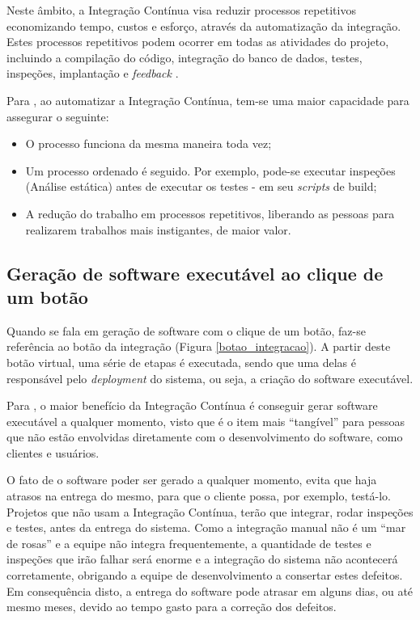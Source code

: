 Neste âmbito, a Integração Contínua visa reduzir processos repetitivos economizando tempo, custos e esforço, através da automatização da integração. Estes processos repetitivos podem ocorrer em todas as atividades do projeto, incluindo a compilação do código, integração do banco de dados, testes, inspeções, implantação e \textit{feedback} \cite{DUVALL}.

Para , ao automatizar a Integração Contínua, tem-se uma maior capacidade para assegurar o seguinte:

\begin{itemize}
    \item{O processo funciona da mesma maneira toda vez;}
    \item{Um processo ordenado é seguido. Por exemplo, pode-se executar inspeções (Análise estática) antes de executar os testes - em seu \textit{scripts} de build;}
    \item{A redução do trabalho em processos repetitivos, liberando as pessoas para realizarem trabalhos mais instigantes, de maior valor.}
\end{itemize}

\subsection{Geração de software executável ao clique de um botão}

Quando se fala em geração de software com o clique de um botão, faz-se referência ao botão da integração (Figura \ref{botao_integracao}). A partir deste botão virtual, uma série de etapas é executada, sendo que uma delas é responsável pelo \textit{deployment} do sistema, ou seja, a criação do software executável.

Para , o maior benefício da Integração Contínua é conseguir gerar software executável a qualquer momento, visto que é o item mais ``tangível''  para pessoas que não estão envolvidas diretamente com o desenvolvimento do software, como clientes e usuários.

O fato de o software poder ser gerado a qualquer momento, evita que haja atrasos na entrega do mesmo, para que o cliente possa, por exemplo, testá-lo. Projetos que não usam a Integração Contínua, terão que integrar, rodar inspeções e testes, antes da entrega do sistema. Como a integração manual não é um ``mar de rosas'' e a equipe não integra frequentemente, a quantidade de testes e inspeções que irão falhar será enorme e a integração do sistema não acontecerá corretamente, obrigando a equipe de desenvolvimento a consertar estes defeitos. Em consequência disto, a entrega do software pode atrasar em alguns dias, ou até mesmo meses, devido ao tempo gasto para a correção dos defeitos.

